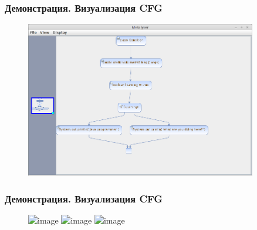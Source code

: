\documentclass{beamer}
\begin{document}
\begin{frame}
\frametitle{Демонстрация. Визуализация CFG}

\begin{figure}[h]
    \begin{center}
        \includegraphics[width=0.9\textwidth]{../fig/cfg_test1.png}
    \end{center}
\end{figure}

\end{frame}
\begin{frame}
\frametitle{Демонстрация. Визуализация CFG}

\begin{figure}[b!]
    \begin{center}
        \includegraphics<1>[width=\textwidth]{fig/zoom1.png}
        \includegraphics<2>[width=\textwidth]{fig/zoom2.png}
        \includegraphics<3>[width=\textwidth]{fig/zoom3.png}
    \end{center}
\end{figure}

\end{frame}
\end{document}
